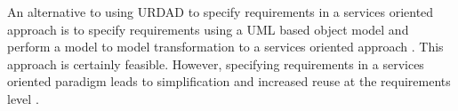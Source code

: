 An alternative to using URDAD to specify requirements in a services oriented approach is to specify requirements using a UML based object model and perform a model to model transformation to a services oriented approach \cite{}. This approach is certainly feasible. However, specifying requirements in a services oriented paradigm leads to simplification and increased reuse at the requirements level \cite{halpin_it_2009,cao_modeling_2008}.

